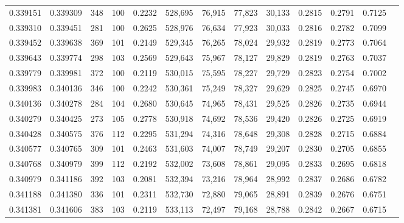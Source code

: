 \begin{tabular}{rrrrrrrrrrrrr}
0.339151 & 0.339309 &   348 & 100 &                                     0.2232 & 528,695 &  76,915 &  77,823 &  30,133 & 0.2815 & 0.2791 & 0.7125 \\
0.339310 & 0.339451 &   281 & 100 &                                     0.2625 & 528,976 &  76,634 &  77,923 &  30,033 & 0.2816 & 0.2782 & 0.7099 \\
0.339452 & 0.339638 &   369 & 101 &                                     0.2149 & 529,345 &  76,265 &  78,024 &  29,932 & 0.2819 & 0.2773 & 0.7064 \\
0.339643 & 0.339774 &   298 & 103 &                                     0.2569 & 529,643 &  75,967 &  78,127 &  29,829 & 0.2819 & 0.2763 & 0.7037 \\
0.339779 & 0.339981 &   372 & 100 &                                     0.2119 & 530,015 &  75,595 &  78,227 &  29,729 & 0.2823 & 0.2754 & 0.7002 \\
0.339983 & 0.340136 &   346 & 100 &                                     0.2242 & 530,361 &  75,249 &  78,327 &  29,629 & 0.2825 & 0.2745 & 0.6970 \\
0.340136 & 0.340278 &   284 & 104 &                                     0.2680 & 530,645 &  74,965 &  78,431 &  29,525 & 0.2826 & 0.2735 & 0.6944 \\
0.340279 & 0.340425 &   273 & 105 &                                     0.2778 & 530,918 &  74,692 &  78,536 &  29,420 & 0.2826 & 0.2725 & 0.6919 \\
0.340428 & 0.340575 &   376 & 112 &                                     0.2295 & 531,294 &  74,316 &  78,648 &  29,308 & 0.2828 & 0.2715 & 0.6884 \\
0.340577 & 0.340765 &   309 & 101 &                                     0.2463 & 531,603 &  74,007 &  78,749 &  29,207 & 0.2830 & 0.2705 & 0.6855 \\
0.340768 & 0.340979 &   399 & 112 &                                     0.2192 & 532,002 &  73,608 &  78,861 &  29,095 & 0.2833 & 0.2695 & 0.6818 \\
0.340979 & 0.341186 &   392 & 103 &                                     0.2081 & 532,394 &  73,216 &  78,964 &  28,992 & 0.2837 & 0.2686 & 0.6782 \\
0.341188 & 0.341380 &   336 & 101 &                                     0.2311 & 532,730 &  72,880 &  79,065 &  28,891 & 0.2839 & 0.2676 & 0.6751 \\
0.341381 & 0.341606 &   383 & 103 &                                     0.2119 & 533,113 &  72,497 &  79,168 &  28,788 & 0.2842 & 0.2667 & 0.6715 \\

\end{tabular}

